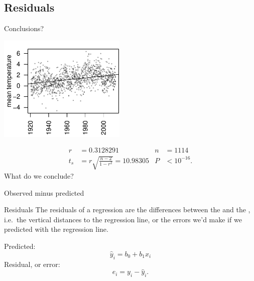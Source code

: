 \subsection{Residuals}


\begin{frame}{Conclusions?}

    \begin{center}
        \includegraphics[height=2in]{usc-temps-just-regression}

    \begin{align*}
        r &= 0.3128291 & n &= 1114 \\
        t_s &=  r \sqrt{ \frac{ n-2}{1-r^2} } = 10.98305 &
        P &< 10^{-16} .
    \end{align*}
    What do we conclude?

    \end{center}
\end{frame}


\begin{frame}{Observed minus predicted}

    \begin{block}{Residuals}
        The residuals of a regression are the differences between the  
        and the ,
        i.e.\ the vertical distances to the regression line,
        or the \alert{errors} we'd make if we predicted with the regression line.
    \end{block}

    \vspace{2em}

    Predicted:
    \[
        \hat y_i = b_0 + b_1 x_i
    \]
    Residual, or error:
    \[
        e_i = y_i - \hat y_i .
    \]

\end{frame}


